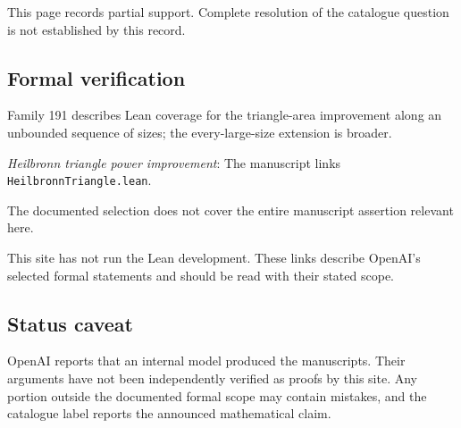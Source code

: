 \documentclass[11pt]{article}
\begin{document}
This page records partial support. Complete resolution of the catalogue question is not established by this record.

\subsection{Formal verification}
Family 191 describes Lean coverage for the triangle-area improvement along an unbounded sequence of sizes; the every-large-size extension is broader.

\textit{Heilbronn triangle power improvement}: The manuscript links \texttt{HeilbronnTriangle.lean}.

The documented selection does not cover the entire manuscript assertion relevant here.

This site has not run the Lean development. These links describe OpenAI’s selected formal statements and should be read with their stated scope.

\subsection{Status caveat}
OpenAI reports that an internal model produced the manuscripts. Their arguments have not been independently verified as proofs by this site. Any portion outside the documented formal scope may contain mistakes, and the catalogue label reports the announced mathematical claim.
\end{document}
